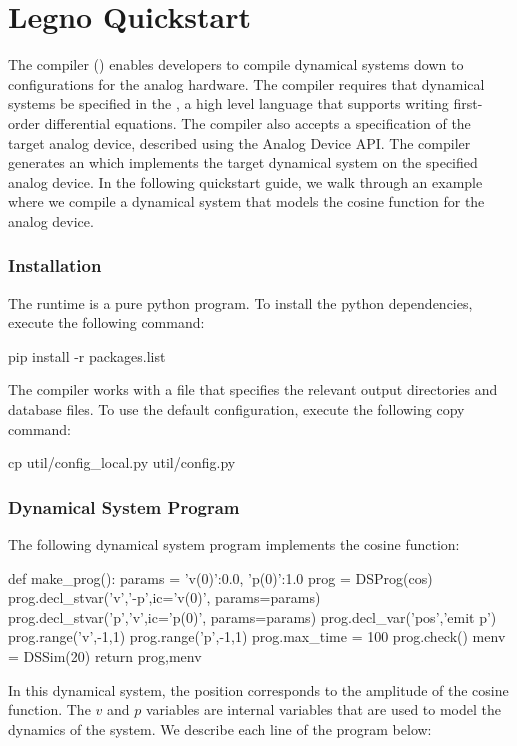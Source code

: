 \chapter{Legno Quickstart}

The \legno compiler () enables developers to compile dynamical
systems down to configurations for the analog hardware. The \legno compiler
requires that dynamical systems be specified in the , a high level language that supports writing first-order
differential equations. The \legno compiler also accepts a specification of the
target analog device, described using the Analog Device API. The \legno compiler
generates an  which implements the target dynamical
system on the specified analog device. In the following quickstart guide, we
walk through an example where we compile a dynamical system that models the
cosine function for the \hcdc analog device. 

\subsection{Installation}

The \grendel runtime is a pure python program. To install the python
dependencies, execute the following command:

\begin{snippet}
  pip install -r packages.list
\end{snippet}

The \legno compiler works with a 
file that specifies the relevant output directories and database files. To use
the default configuration, execute the following copy command:

\begin{snippet}
cp util/config_local.py util/config.py
\end{snippet}

\subsection{Dynamical System Program}
The following dynamical system program implements the cosine function:
\begin{dssnippet}
def make_prog():
  params = {
    'v(0)':0.0,
    'p(0)':1.0
  }
  prog = DSProg(cos)
  prog.decl_stvar('v','-p',ic='{v(0)}', params=params)
  prog.decl_stvar('p','v',ic='{p(0)}', params=params)
  prog.decl_var('pos','emit p')
  prog.range('v',-1,1)
  prog.range('p',-1,1)
  prog.max_time = 100
  prog.check()
  menv = DSSim(20)
  return prog,menv
  
\end{dssnippet}
In this dynamical system, the position  corresponds to the amplitude of
the cosine function. The $v$ and $p$ variables are internal variables that are
used to model the dynamics of the system. We describe each line of the program
below:

